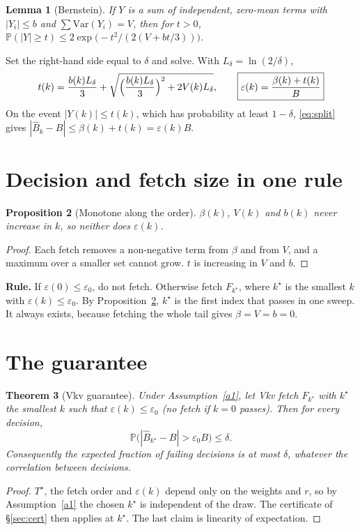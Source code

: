 \documentclass[11pt]{article}
\newcommand{\eps}{\varepsilon}
\newtheorem{lemma}{Lemma}
\newtheorem{proposition}[lemma]{Proposition}
\newtheorem{theorem}[lemma]{Theorem}
\theoremstyle{definition}
\theoremstyle{remark}
\begin{document}
\begin{lemma}[Bernstein]
If $Y$ is a sum of independent, zero-mean terms with $|Y_i| \le b$ and $\sum \mathrm{Var}(Y_i) = V$, then for $t > 0$,
$\mathbb P(|Y| \ge t) \le 2\exp\bigl(-t^2 / (2(V + bt/3))\bigr)$.
\end{lemma}

Set the right-hand side equal to $\delta$ and solve. With $L_\delta = \ln(2/\delta)$,
\[ t(k) = \frac{b(k) L_\delta}{3} + \sqrt{\Bigl(\frac{b(k) L_\delta}{3}\Bigr)^2 + 2V(k)L_\delta}, \qquad
\boxed{\eps(k) = \frac{\beta(k) + t(k)}{B}} \]
On the event $|Y(k)| \le t(k)$, which has probability at least $1 - \delta$, \eqref{eq:split} gives
$|\hat B_k - B| \le \beta(k) + t(k) = \eps(k) B$.

\section{Decision and fetch size in one rule}

\begin{proposition}[Monotone along the order]\label{prop:mono}
$\beta(k)$, $V(k)$ and $b(k)$ never increase in $k$, so neither does $\eps(k)$.
\end{proposition}
\begin{proof}
Each fetch removes a non-negative term from $\beta$ and from $V$, and a maximum over a smaller set cannot grow. $t$ is
increasing in $V$ and $b$.
\end{proof}

\textbf{Rule.} If $\eps(0) \le \eps_0$, do not fetch. Otherwise fetch $F_{k^\star}$, where $k^\star$ is the smallest $k$
with $\eps(k) \le \eps_0$. By Proposition~\ref{prop:mono}, $k^\star$ is the first index that passes in one sweep. It always
exists, because fetching the whole tail gives $\beta = V = b = 0$.

\section{The guarantee}

\begin{theorem}[Vkv guarantee]\label{thm:vkv}
Under Assumption~\ref{a1}, let Vkv fetch $F_{k^\star}$ with $k^\star$ the smallest $k$ such that $\eps(k) \le \eps_0$
(no fetch if $k = 0$ passes). Then for every decision,
\[ \mathbb P\bigl(|\hat B_{k^\star} - B| > \eps_0 B\bigr) \le \delta. \]
Consequently the expected fraction of failing decisions is at most $\delta$, whatever the correlation between decisions.
\end{theorem}
\begin{proof}
$T^\star$, the fetch order and $\eps(k)$ depend only on the weights and $r$, so by Assumption~\ref{a1} the chosen $k^\star$
is independent of the draw. The certificate of \S\ref{sec:cert} then applies at $k^\star$. The last claim is linearity of
expectation.
\end{proof}
\end{document}

